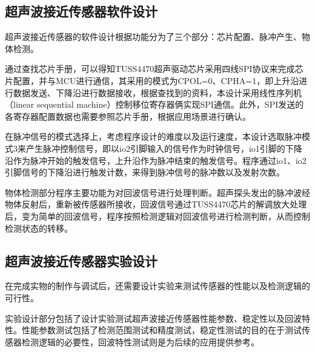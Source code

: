 \subsection{超声波接近传感器软件设计}
 超声波接近传感器的软件设计根据功能分为了三个部分：芯片配置、脉冲产生、物体检测。\par
 通过查找芯片手册，可以得知TUSS4470超声驱动芯片采用四线SPI协议来完成芯片配置，并与MCU进行通信，其采用的模式为CPOL=0、CPHA=1，即上升沿进行数据发送、下降沿进行数据接收，根据查找到的资料，本设计采用线性序列机（linear sequential machine）控制移位寄存器俩实现SPI通信。此外，SPI发送的各寄存器配置数据也需要参照芯片手册，根据应用场景进行确认。\par
 在脉冲信号的模式选择上，考虑程序设计的难度以及运行速度，本设计选取脉冲模式3来产生脉冲控制信号，即以io2引脚输入的信号作为时钟信号，io1引脚的下降沿作为脉冲开始的触发信号，上升沿作为脉冲结束的触发信号。程序通过io1、io2引脚信号的下降沿进行触发计数，来得到脉冲信号的脉冲数以及发射次数。\par
 物体检测部分程序主要功能为对回波信号进行处理判断。超声探头发出的脉冲波经物体反射后，重新被传感器所接收，回波信号通过TUSS4470芯片的解调放大处理后，变为简单的回波信号，程序按照检测逻辑对回波信号进行检测判断，从而控制检测状态的转移。
\subsection{超声波接近传感器实验设计}
 在完成实物的制作与调试后，还需要设计实验来测试传感器的性能以及检测逻辑的可行性。\par
 实验设计部分包括了设计实验测试超声波接近传感器性能参数、稳定性以及回波特性。性能参数测试包括了检测范围测试和精度测试，稳定性测试的目的在于测试传感器检测逻辑的必要性，回波特性测试则是为后续的应用提供参考。
 
 